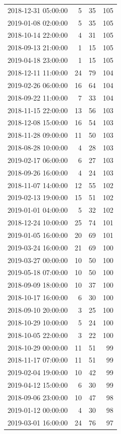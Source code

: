 \begin{tabular}{lrrr}
2018-12-31 05:00:00 & 5 & 35 & 105 \\
2019-01-08 02:00:00 & 5 & 35 & 105 \\
2018-10-14 22:00:00 & 4 & 31 & 105 \\
2018-09-13 21:00:00 & 1 & 15 & 105 \\
2019-04-18 23:00:00 & 1 & 15 & 105 \\
2018-12-11 11:00:00 & 24 & 79 & 104 \\
2019-02-26 06:00:00 & 16 & 64 & 104 \\
2018-09-22 11:00:00 & 7 & 33 & 104 \\
2018-11-15 22:00:00 & 13 & 56 & 103 \\
2018-12-08 15:00:00 & 16 & 54 & 103 \\
2018-11-28 09:00:00 & 11 & 50 & 103 \\
2018-08-28 10:00:00 & 4 & 28 & 103 \\
2019-02-17 06:00:00 & 6 & 27 & 103 \\
2018-09-26 16:00:00 & 4 & 24 & 103 \\
2018-11-07 14:00:00 & 12 & 55 & 102 \\
2019-02-13 19:00:00 & 15 & 51 & 102 \\
2019-01-01 04:00:00 & 5 & 32 & 102 \\
2018-12-24 10:00:00 & 25 & 74 & 101 \\
2019-01-05 16:00:00 & 20 & 69 & 101 \\
2019-03-24 16:00:00 & 21 & 69 & 100 \\
2019-03-27 00:00:00 & 10 & 50 & 100 \\
2019-05-18 07:00:00 & 10 & 50 & 100 \\
2018-09-09 18:00:00 & 10 & 37 & 100 \\
2018-10-17 16:00:00 & 6 & 30 & 100 \\
2018-09-10 20:00:00 & 3 & 25 & 100 \\
2018-10-29 10:00:00 & 5 & 24 & 100 \\
2018-10-05 22:00:00 & 3 & 22 & 100 \\
2018-10-29 00:00:00 & 11 & 51 & 99 \\
2018-11-17 07:00:00 & 11 & 51 & 99 \\
2019-02-04 19:00:00 & 10 & 42 & 99 \\
2019-04-12 15:00:00 & 6 & 30 & 99 \\
2018-09-06 23:00:00 & 10 & 47 & 98 \\
2019-01-12 00:00:00 & 4 & 30 & 98 \\
2019-03-01 16:00:00 & 24 & 76 & 97 \\

\end{tabular}
